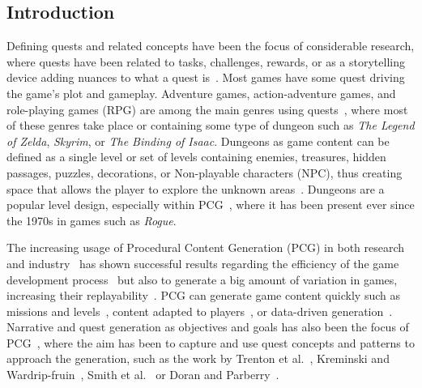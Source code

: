 \subsection{Introduction}

Defining quests and related concepts have been the focus of considerable research, where quests have been related to tasks, challenges, rewards, or as a storytelling device adding nuances to what a quest is~\cite{p8Doran2011-questsMMORPGs,Breault2021-CONANQuestGen,Trenton2010-questpatterns,yu2020quest}. Most games have some quest driving the game's plot and gameplay. Adventure games, action-adventure games, and role-playing games (RPG) are among the main genres using quests~\cite{p812-howard2008quests}, where most of these genres take place or containing some type of dungeon such as \emph{The Legend of Zelda}, \emph{Skyrim}, or \emph{The Binding of Isaac}. Dungeons as game content can be defined as a single level or set of levels containing enemies, treasures, hidden passages, puzzles, decorations, or Non-playable characters (NPC), thus creating space that allows the player to explore the unknown areas~\cite{p8Dahlskog2015-patternsDungeonsGens}. Dungeons are a popular level design, especially within PCG~\cite{p8shaker_procedural_2016,Yannakakis2018,Liapis2020-pcgWorkshop}, where it has been present ever since the 1970s in games such as \emph{Rogue}.

The increasing usage of Procedural Content Generation (PCG) in both research and industry~\cite{p8Liapis2020-pcgWorkshop,1-Lavender2016TheZD} has shown successful results regarding the efficiency of the game development process~\cite{p8Pedersen2010-modelingPlayerExp} but also to generate a big amount of variation in games, increasing their replayability~\cite{p8Smith2014-understandingPCG}. PCG can generate game content quickly such as missions and levels~\cite{p8dormans2011generating}, content adapted to players~\cite{p8hastings_evolving_2009}, or data-driven generation~\cite{p8Green2018,summerville2018procedural}. Narrative and quest generation as objectives and goals has also been the focus of PCG~\cite{p8Mason2019-LumeStoryGeneration,flodtol2020-WIPMakeSenseDungs,ammanabrolu2019-towardQuestGeneration}, where the aim has been to capture and use quest concepts and patterns to approach the generation, such as the work by Trenton et al.~\cite{p8Trenton2010-questpatterns}, Kreminski and Wardrip-fruin~\cite{p8Kreminski2018-SketchingStorylets}, Smith et al.~\cite{p8Smith2011-situatingQuests} or Doran and Parberry~\cite{p8Doran2011-questsMMORPGs}. 

